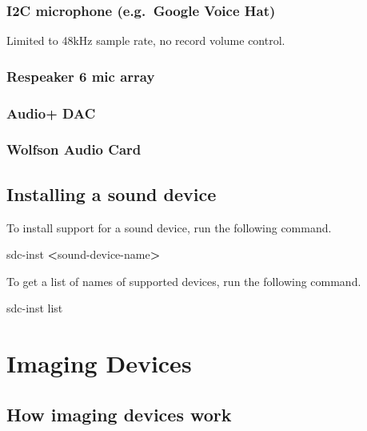 \documentclass[
]{book}
\newenvironment{Shaded}{\begin{snugshade}}{\end{snugshade}}
\newcommand{\ExtensionTok}[1]{#1}
\newcommand{\NormalTok}[1]{#1}
\newcommand{\OperatorTok}[1]{\textcolor[rgb]{0.81,0.36,0.00}{\textbf{#1}}}
\begin{document}
\subsection{I2C microphone (e.g.~Google Voice Hat)}\label{i2c-microphone-e.g.-google-voice-hat}

Limited to 48kHz sample rate, no record volume control.

\subsection{Respeaker 6 mic array}\label{respeaker-6-mic-array}

\subsection{Audio+ DAC}\label{audio-dac}

\subsection{Wolfson Audio Card}\label{wolfson-audio-card}

\section{Installing a sound device}\label{installing-a-sound-device}

To install support for a sound device, run the following command.

\begin{Shaded}
\begin{Highlighting}[]
\ExtensionTok{sdc{-}inst} \OperatorTok{\textless{}}\NormalTok{sound{-}device{-}name}\OperatorTok{\textgreater{}}
\end{Highlighting}
\end{Shaded}

To get a list of names of supported devices, run the following command.

\begin{Shaded}
\begin{Highlighting}[]
\ExtensionTok{sdc{-}inst}\NormalTok{ list}
\end{Highlighting}
\end{Shaded}

\chapter{Imaging Devices}\label{imaging-devices}

\section{How imaging devices work}\label{how-imaging-devices-work}
\end{document}
